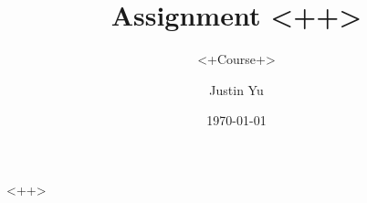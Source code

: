 \documentclass[12pt]{scrartcl}
\title{Assignment <++>}
\subtitle{<+Course+>}
\author{Justin Yu}
\date{\today}
\begin{document}
\maketitle
<++>
\end{document}
